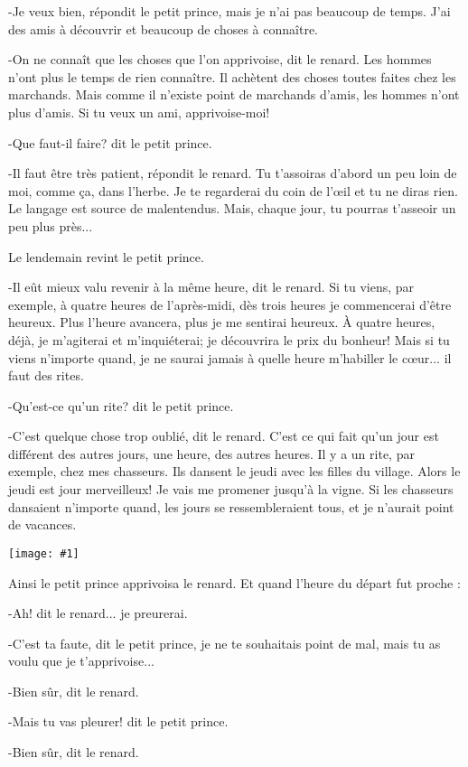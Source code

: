 \documentclass{report}
\newcommand{\incpic}[1]{%
\end{paracol}
\begin{center}
    \texttt{[image: \#1]}
\end{center}
\begin{paracol}{2}}
\begin{document}
\begin{paracol}{2}
-Je veux bien, répondit le petit prince, mais je n'ai pas beaucoup de temps. J'ai des amis à découvrir et beaucoup de choses à connaître.

-On ne connaît que les choses que l'on apprivoise, dit le renard. Les hommes n'ont plus le temps de rien connaître. Il achètent des choses toutes faites chez les marchands. Mais comme il n'existe point de marchands d'amis, les hommes n'ont plus d'amis. Si tu veux un ami, apprivoise-moi!

-Que faut-il faire? dit le petit prince.

-Il faut être très patient, répondit le renard. Tu t'assoiras d'abord un peu loin de moi, comme ça, dans l'herbe. Je te regarderai du coin de l'œil et tu ne diras rien. Le langage est source de malentendus. Mais, chaque jour, tu pourras t'asseoir un peu plus près...

Le lendemain revint le petit prince.

-Il eût mieux valu revenir à la même heure, dit le renard. Si tu viens, par exemple, à quatre heures de l'après-midi, dès trois heures je commencerai d'être heureux. Plus l'heure avancera, plus je me sentirai heureux. À quatre heures, déjà, je m'agiterai et m'inquiéterai; je découvrira le prix du bonheur! Mais si tu viens n'importe quand, je ne saurai jamais à quelle heure m'habiller le cœur... il faut des rites.

-Qu'est-ce qu'un rite? dit le petit prince.

-C'est quelque chose trop oublié, dit le renard. C'est ce qui fait qu'un jour est différent des autres jours, une heure, des autres heures. Il y a un rite, par exemple, chez mes chasseurs. Ils dansent le jeudi avec les filles du village. Alors le jeudi est jour merveilleux! Je vais me promener jusqu'à la vigne. Si les chasseurs dansaient n'importe quand, les jours se ressembleraient tous, et je n'aurait point de vacances.

\incpic{pic/image39.jpeg}

Ainsi le petit prince apprivoisa le renard. Et quand l'heure du départ fut proche :

-Ah! dit le renard... je preurerai.

-C'est ta faute, dit le petit prince, je ne te souhaitais point de mal, mais tu as voulu que je t'apprivoise...

-Bien sûr, dit le renard.

-Mais tu vas pleurer! dit le petit prince.

-Bien sûr, dit le renard.


\end{paracol}
\end{document}
